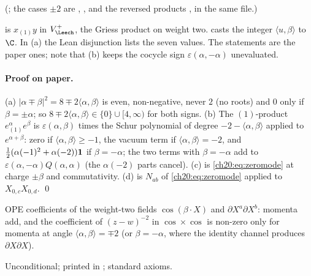 (; the cases $\pm2$ are
, , and the reversed products
,  in the same file.)
\begin{dictionary}
 is $x_{(1)}y$ in $\chtwentyVL$, the Griess product on weight two.  
casts the integer $\langle u,\beta\rangle$ to $\C$.  In (a) the Lean disjunction lists the seven values.  The statements
are the paper ones; note that (b) keeps the cocycle sign $\varepsilon(\alpha,-\alpha)$ unevaluated.
\end{dictionary}
\paragraph{Proof on paper.}  (a) $|\alpha\mp\beta|^2=8\mp2\langle\alpha,\beta\rangle$ is even, non-negative, never $2$ (no
roots) and $0$ only if $\beta=\pm\alpha$; so $8\mp2\langle\alpha,\beta\rangle\in\{0\}\cup[4,\infty)$ for both signs.  (b) The
$(1)$-product $e^{\alpha}_{(1)}e^{\beta}$ is $\varepsilon(\alpha,\beta)$ times the Schur polynomial of degree
$-2-\langle\alpha,\beta\rangle$ applied to $e^{\alpha+\beta}$: zero if $\langle\alpha,\beta\rangle\ge-1$, the vacuum term if
$\langle\alpha,\beta\rangle=-2$, and $\tfrac12(\alpha(-1)^2+\alpha(-2))\mathbf 1$ if $\beta=-\alpha$; the two terms with $\beta=-\alpha$ add
to $\varepsilon(\alpha,-\alpha)Q(\alpha,\alpha)$ (the $\alpha(-2)$ parts cancel).  (c) is \eqref{ch20:eq:zeromode} at charge $\pm\beta$ and
commutativity.  (d) is $N_{ab}$ of \eqref{ch20:eq:zeromode} applied to $X_{0,c}X_{0,d}$. \qed
\begin{physics}
OPE coefficients of the weight-two fields $\cos(\beta\cdot X)$ and $\partial X^a\partial X^b$: momenta add, and the
coefficient of $(z-w)^{-2}$ in $\cos\times\cos$ is non-zero only for momenta at angle $\langle\alpha,\beta\rangle=\mp2$ (or
$\beta=-\alpha$, where the identity channel produces $\partial X\partial X$).
\end{physics}
\begin{status}
Unconditional; printed in ; standard axioms.
\end{status}

